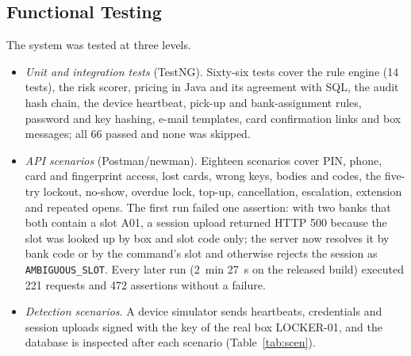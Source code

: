 \subsection{Functional Testing}

The system was tested at three levels.
\begin{itemize}
  \item \textit{Unit and integration tests} (TestNG). Sixty-six tests cover the rule engine (14 tests), the risk
        scorer, pricing in Java and its agreement with SQL, the audit hash chain, the device heartbeat, pick-up and
        bank-assignment rules, password and key hashing, e-mail templates, card confirmation links and box messages;
        all 66 passed and none was skipped.
  \item \textit{API scenarios} (Postman/newman). Eighteen scenarios cover PIN, phone, card and fingerprint access,
        lost cards, wrong keys, bodies and codes, the five-try lockout, no-show, overdue lock, top-up, cancellation,
        escalation, extension and repeated opens. The first run failed one assertion: with two banks that both contain
        a slot A01, a session upload returned HTTP 500 because the slot was looked up by box and slot code only; the
        server now resolves it by bank code or by the command's slot and otherwise rejects the session as
        \texttt{AMBIGUOUS\_SLOT}. Every later run (2~min 27~s on the released build) executed 221 requests and 472
        assertions without a failure.
  \item \textit{Detection scenarios}. A device simulator sends heartbeats, credentials and session uploads signed with
        the key of the real box LOCKER-01, and the database is inspected after each scenario (Table~\ref{tab:scen}).
\end{itemize}

